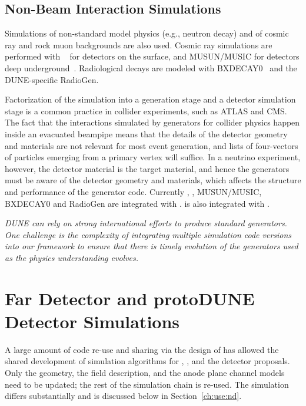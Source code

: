 \documentclass[../main-v1.tex]{subfiles}
\begin{document}
\subsection{Non-Beam Interaction Simulations}
Simulations of non-standard model physics (e.g., neutron decay) and of cosmic ray and rock muon backgrounds are also used.  Cosmic ray simulations are performed with ~\cite{Wentz:2003bp,Dembinski:2020wrp} for detectors on the surface, and MUSUN/MUSIC  for detectors deep underground~\cite{Kudryavtsev:2008qh,LBNEDOCDB9673}.  Radiological decays are modeled with BXDECAY0~\cite{Ponkratenko:2000um} and the DUNE-specific RadioGen.

Factorization of the simulation into a generation stage and a detector simulation stage is a common practice 
in collider experiments, such as ATLAS and CMS.  The fact that the interactions simulated by generators for collider physics happen inside an evacuated beampipe means that the details of the detector geometry and materials are not relevant for most event generation, and lists of four-vectors of particles emerging from a primary vertex will suffice.  In a neutrino experiment, however, the detector material is the target material, and hence the generators must be aware of the detector geometry and materials, which affects the structure and performance of the generator code.  Currently , , MUSUN/MUSIC, BXDECAY0 and RadioGen are integrated with .   is also integrated with .

{\it DUNE can rely on strong international efforts to produce standard generators. One challenge is the complexity of integrating multiple simulation code versions into our framework to ensure that there is timely evolution of the generators used as the physics understanding evolves.}

\section{Far Detector and protoDUNE Detector Simulations}

A large amount of code re-use and sharing via the design of  has allowed the shared development of simulation algorithms for , , 
and the   detector proposals.  Only the geometry, the field description,  and the anode plane channel models need to be updated; the rest of the simulation chain is re-used.  The  simulation differs substantially and is discussed below in 
Section~\ref{ch:use:nd}.
\end{document}
